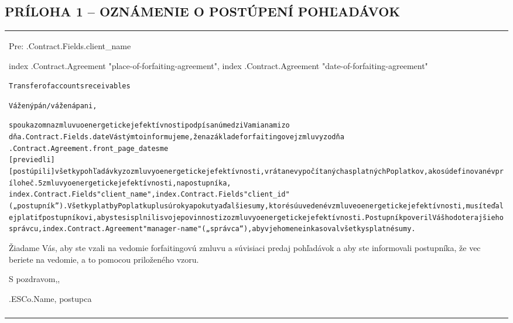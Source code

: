 \documentclass[a4paper]{article}
\begin{document}
\vspace{1cm}

\subsection{PRÍLOHA 1 – OZNÁMENIE O POSTÚPENÍ POHĽADÁVOK}

\vspace{2mm}

\begin{tabu}{|X|} \tabucline{}

  Pre: {{.Contract.Fields.client_name}} \par

  \begin{flushright}
    {{index .Contract.Agreement "place-of-forfaiting-agreement"}}, {{index .Contract.Agreement "date-of-forfaiting-agreement"}}
  \end{flushright}

  \begin{alltt}  Transfer of accounts receivables

    Vážený pán/vážená pani,


    s poukazom na zmluvu o energetickej efektívnosti podpísanú medzi Vami a nami zo 
    dňa {{.Contract.Fields.date}} Vás týmto informujeme, že na základe forfaitingovej zmluvy zo dňa 
    {{.Contract.Agreement.front_page_date}} sme 
    [previedli] 
    [postúpili] všetky pohľadávky zo zmluvy o energetickej efektívnosti, vrátane vypočítaných a splatných Poplatkov, ako sú definované v prílohe č. 5 zmluvy o energetickej efektívnosti, na postupníka, 
    {{index .Contract.Fields "client_name"}},  {{index .Contract.Fields "client_id"}} („postupník”). Všetky platby Poplatku plus úroky a pokuty a ďalšie sumy, ktoré sú uvedené v zmluve o energetickej efektívnosti, musíte ďalej platiť postupníkovi, aby ste si splnili svoje povinnosti zo zmluvy o energetickej efektívnosti. Postupník poveril Vášho doterajšieho 
    správcu,  {{index .Contract.Agreement "manager-name"}} („správca“), aby v jeho mene inkasoval všetky splatné sumy. 


  \end{alltt}

  \vspace{5mm}

  Žiadame Vás, aby ste vzali na vedomie forfaitingovú zmluvu a súvisiaci predaj pohľadávok a aby ste informovali postupníka, že vec beriete na vedomie, a to pomocou priloženého vzoru.


  \vspace{1cm}

  S pozdravom,,

  \vspace{1cm}

   {{.ESCo.Name}}, postupca

  \vspace{1cm} \\\tabucline{}

\end{tabu}
\end{document}
